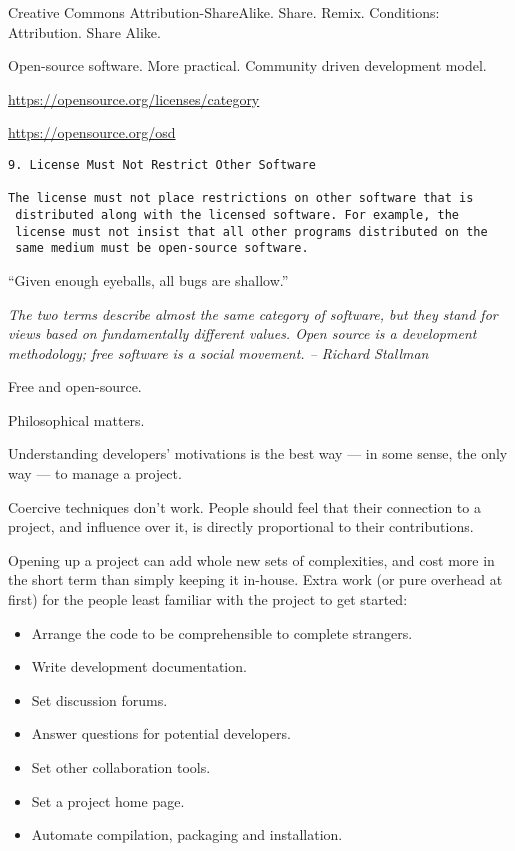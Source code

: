 \documentclass[landscape,30pt]{foils}
\begin{document}
Creative Commons Attribution-ShareAlike.  Share.  Remix.  Conditions: Attribution.  Share Alike.

Open-source software.  More practical.  Community driven development model.

\url{https://opensource.org/licenses/category}

\url{https://opensource.org/osd}

{\tiny
\begin{verbatim}
9. License Must Not Restrict Other Software

The license must not place restrictions on other software that is
 distributed along with the licensed software. For example, the
 license must not insist that all other programs distributed on the
 same medium must be open-source software.
\end{verbatim}
}

``Given enough eyeballs, all bugs are shallow.''

{\em The two terms describe almost the same category of software, but they
stand for views based on fundamentally different values. Open source
is a development methodology; free software is a social movement.  -- Richard Stallman}

Free and open-source.

Philosophical matters.  

Understanding developers' motivations is the best way — in some sense, the only way — to manage a project.

Coercive techniques don't work.  People should feel that their
connection to a project, and influence over it, is directly
proportional to their contributions.

Opening up a project can add whole new sets of complexities, and cost
more in the short term than simply keeping it in-house.  Extra work
(or pure overhead at first) for the people least familiar with the
project to get started:

\begin{itemize}
\item Arrange the code to be comprehensible to complete strangers.
\item Write development documentation.
\item Set discussion forums.
\item Answer questions for potential developers.
\item Set other collaboration tools.
\item Set a project home page.
\item Automate compilation, packaging and installation.
\end{itemize}
\end{document}
